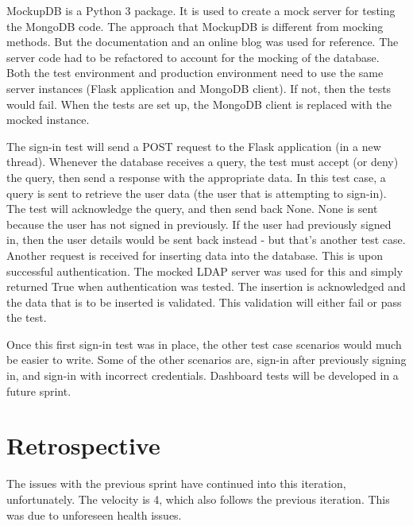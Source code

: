MockupDB is a Python 3 package. It is used to create a mock server for testing the MongoDB code. The approach that MockupDB is different from mocking methods. But the documentation and an online blog was used for reference\cite{DavisMongoDB}. The server code had to be refactored to account for the mocking of the database. Both the test environment and production environment need to use the same server instances (Flask application and MongoDB client). If not, then the tests would fail. When the tests are set up, the MongoDB client is replaced with the mocked instance.

The sign-in test will send a POST request to the Flask application (in a new thread). Whenever the database receives a query, the test must accept (or deny) the query, then send a response with the appropriate data. In this test case, a query is sent to retrieve the user data (the user that is attempting to sign-in). The test will acknowledge the query, and then send back None. None is sent because the user has not signed in previously. If the user had previously signed in, then the user details would be sent back instead - but that's another test case. Another request is received for inserting data into the database. This is upon successful authentication. The mocked LDAP server was used for this and simply returned True when authentication was tested. The insertion is acknowledged and the data that is to be inserted is validated. This validation will either fail or pass the test.

Once this first sign-in test was in place, the other test case scenarios would much be easier to write. Some of the other scenarios are, sign-in after previously signing in, and sign-in with incorrect credentials. Dashboard tests will be developed in a future sprint.

\section{Retrospective}
The issues with the previous sprint have continued into this iteration, unfortunately. The velocity is 4, which also follows the previous iteration. This was due to unforeseen health issues.
